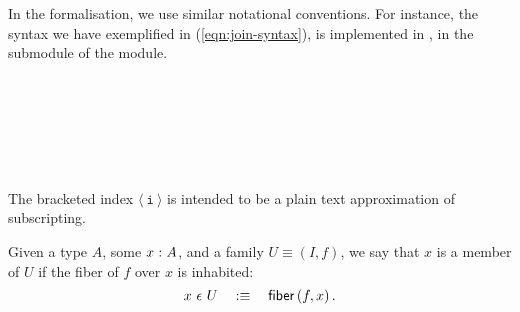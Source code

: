 In the \veragda{} formalisation, we use similar notational conventions. For instance,
the syntax we have exemplified in (\ref{eqn:join-syntax}), is implemented in \veragda{},
in the  submodule of the  module.
\begin{code}%
\>[0]\AgdaSpace{}%
\AgdaSpace{}%
\AgdaSymbol{(}\AgdaSpace{}%
\AgdaSymbol{:}\AgdaSpace{}%
\AgdaSpace{}%
\AgdaSymbol{)}\AgdaSpace{}%
\AgdaSymbol{\{}\AgdaSpace{}%
\AgdaSymbol{:}\AgdaSpace{}%
\AgdaSymbol{\}}\AgdaSpace{}%
\AgdaSymbol{(}\AgdaSpace{}%
\AgdaSymbol{:}\AgdaSpace{}%
\AgdaSpace{}%
\AgdaSpace{}%
\AgdaSpace{}%
\AgdaSpace{}%
\AgdaSymbol{)}\AgdaSpace{}%
\<%
\\
%
\\[\AgdaEmptyExtraSkip]%
\>[0][@{}l@{\AgdaIndent{0}}]%
\>[2]\AgdaSpace{}%
\AgdaSymbol{:}\AgdaSpace{}%
\AgdaSymbol{\{}\AgdaSpace{}%
\AgdaSymbol{:}\AgdaSpace{}%
\AgdaSpace{}%
\AgdaSymbol{\}}\AgdaSpace{}%
\AgdaSpace{}%
\AgdaSymbol{(}\AgdaSpace{}%
\AgdaSpace{}%
\AgdaSymbol{)}\AgdaSpace{}%
\AgdaSpace{}%
\<%
\\
%
\>[2]\AgdaSpace{}%
\AgdaSymbol{\{}\AgdaSpace{}%
\AgdaSymbol{=}\AgdaSpace{}%
\AgdaSymbol{\}}\AgdaSpace{}%
\AgdaSpace{}%
\AgdaSymbol{=}\AgdaSpace{}%
\AgdaSpace{}%
\AgdaSymbol{(}\AgdaSpace{}%
\AgdaOperator{\AgdaInductiveConstructor{,}}\AgdaSpace{}%
\AgdaSymbol{)}\<%
\\
%
\\[\AgdaEmptyExtraSkip]%
%
\>[2]\AgdaSpace{}%
\AgdaSpace{}%
\AgdaSpace{}%
\AgdaSpace{}%
\AgdaSpace{}%
\AgdaSymbol{)}\AgdaSpace{}%
\AgdaSymbol{=}\AgdaSpace{}%
\AgdaSpace{}%
\AgdaSpace{}%
\AgdaSpace{}%
\<%
\end{code}

The bracketed index $\mathtt{⟨~i~⟩}$ is intended to be a plain text approximation of
subscripting.

\begin{defn}\label{defn:fam-mem}
  Given a type $A$, some $x\hspace{0.1mm}:\hspace{0.1mm}A$, and a family $U \equiv (I, f)$, we say
  that $x$ is a member of $U$ if the fiber of $f$ over $x$ is inhabited:
  \begin{equation*}
    x~\epsilon~U \quad:\equiv\quad \mathsf{fiber}\left(f, x\right).
  \end{equation*}
\end{defn}
